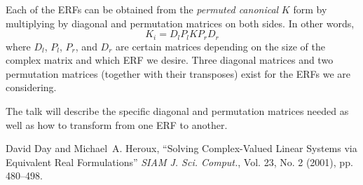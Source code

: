\documentclass{report}
\begin{document}
Each of the ERFs can be obtained from the \emph{permuted canonical} $K$
form by multiplying by diagonal and permutation matrices on both sides.
In other words,
\begin{equation*}
\label{kiform} K_i = D_l P_l K P_r D_r
\end{equation*}
where $D_l$, $P_l$, $P_r$, and $D_r$ are certain matrices depending on
the size of the complex matrix and which ERF we desire. Three diagonal
matrices and two permutation matrices (together with their transposes)
exist for the ERFs we are considering.

The talk will describe the specific diagonal and permutation
matrices needed as well as how to transform from one ERF to another.

\begin{thebibliography}{1}

David Day and Michael~A. Heroux, ``Solving Complex-Valued Linear
Systems via Equivalent Real Formulations'' \emph{SIAM J. Sci.
Comput.}, Vol. 23, No. 2 (2001), pp. 480--498.

\end{thebibliography}
\end{document}
